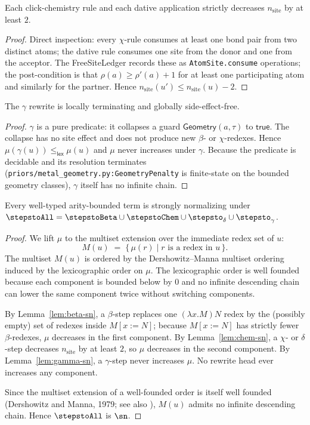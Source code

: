 \begin{lemma}
\label{lem:chem-sn}
Each click-chemistry rule and each dative application strictly decreases
$n_{\text{site}}$ by at least $2$.
\end{lemma}
\begin{proof}
Direct inspection: every $\chi$-rule consumes at least one bond pair from
two distinct atoms; the dative rule consumes one site from the donor and
one from the acceptor. The FreeSiteLedger records these as
\texttt{AtomSite.consume} operations; the post-condition is that
$\rho(a) \ge \rho'(a) + 1$ for at least one participating atom and similarly
for the partner. Hence $n_{\text{site}}(u') \le n_{\text{site}}(u) - 2$.
\end{proof}

\begin{lemma}
\label{lem:gamma-sn}
The $\gamma$ rewrite is locally terminating and globally side-effect-free.
\end{lemma}
\begin{proof}
$\gamma$ is a pure predicate: it collapses a guard
$\mathsf{Geometry}(a,\tau)$ to $\mathsf{true}$. The collapse has no site
effect and does not produce new $\beta$- or $\chi$-redexes. Hence
$\mu(\gamma(u)) \le_{\mathsf{lex}} \mu(u)$ and $\mu$ never increases under
$\gamma$. Because the predicate is decidable and its resolution terminates
(\texttt{priors/metal\_geometry.py:GeometryPenalty} is finite-state on the
bounded geometry classes), $\gamma$ itself has no infinite chain.
\end{proof}

\begin{theorem}
\label{thm:sn}
Every well-typed arity-bounded term is strongly normalizing under
$\stepstoAll = \stepstoBeta \cup \stepstoChem \cup \stepsto_{\delta} \cup
\stepsto_{\gamma}$.
\end{theorem}
\begin{proof}
We lift $\mu$ to the multiset extension over the immediate redex set of $u$:
\[
  M(u) \;=\; \{\, \mu(r) \mid r \text{ is a redex in } u \,\}.
\]
The multiset $M(u)$ is ordered by the Dershowitz--Manna multiset
ordering induced by the lexicographic order on $\mu$. The lexicographic
order is well founded because each component is bounded below by $0$ and
no infinite descending chain can lower the same component twice without
switching components.

By Lemma~\ref{lem:beta-sn}, a $\beta$-step replaces one $(\lambda x.M)N$
redex by the (possibly empty) set of redexes inside $M[x:=N]$; because
$M[x:=N]$ has strictly fewer $\beta$-redexes, $\mu$ decreases in the first
component. By Lemma~\ref{lem:chem-sn}, a $\chi$- or $\delta$-step decreases
$n_{\text{site}}$ by at least $2$, so $\mu$ decreases in the second
component. By Lemma~\ref{lem:gamma-sn}, a $\gamma$-step never increases
$\mu$. No rewrite head ever increases any component.

Since the multiset extension of a well-founded order is itself well
founded (Dershowitz and Manna, 1979; see also \cite{Girard1989}), $M(u)$
admits no infinite descending chain. Hence $\stepstoAll$ is $\sn$.
\end{proof}

